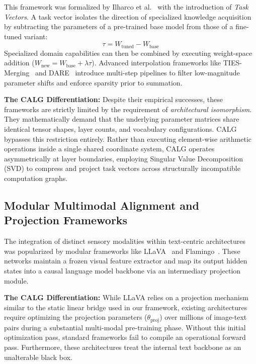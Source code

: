 \documentclass[11pt]{article}
\begin{document}
This framework was formalized by Ilharco et al.~\cite{ilharco2022editing} with the introduction of \textit{Task Vectors}. A task vector isolates the direction of specialized knowledge acquisition by subtracting the parameters of a pre-trained base model from those of a fine-tuned variant:
$$ \tau = W_{\text{tuned}} - W_{\text{base}} $$
Specialized domain capabilities can then be combined by executing weight-space addition ($W_{\text{new}} = W_{\text{base}} + \lambda \tau$). Advanced interpolation frameworks like TIES-Merging~\cite{yadav2023ties} and DARE~\cite{yu2024language} introduce multi-step pipelines to filter low-magnitude parameter shifts and enforce sparsity prior to summation.

\textbf{The CALG Differentiation:} Despite their empirical successes, these frameworks are strictly limited by the requirement of \textit{architectural isomorphism}. They mathematically demand that the underlying parameter matrices share identical tensor shapes, layer counts, and vocabulary configurations. CALG bypasses this restriction entirely. Rather than executing element-wise arithmetic operations inside a single shared coordinate system, CALG operates asymmetrically at layer boundaries, employing Singular Value Decomposition (SVD) to compress and project task vectors across structurally incompatible computation graphs.

\subsection{Modular Multimodal Alignment and Projection Frameworks}
The integration of distinct sensory modalities within text-centric architectures was popularized by modular frameworks like LLaVA~\cite{liu2023visual} and Flamingo~\cite{alayrac2022flamingo}. These networks maintain a frozen visual feature extractor and map its output hidden states into a causal language model backbone via an intermediary projection module. 

\textbf{The CALG Differentiation:} While LLaVA relies on a projection mechanism similar to the static linear bridge used in our framework, existing architectures require optimizing the projection parameters ($\theta_{\text{proj}}$) over millions of image-text pairs during a substantial multi-modal pre-training phase. Without this initial optimization pass, standard frameworks fail to compile an operational forward pass. Furthermore, these architectures treat the internal text backbone as an unalterable black box.
\end{document}
